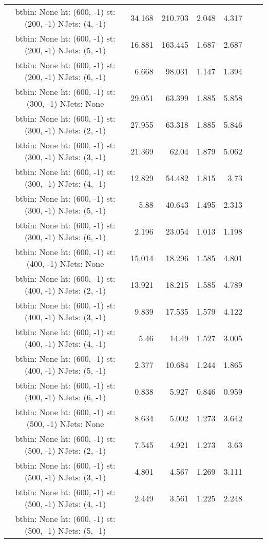 \documentclass[12pt]{paper}
\begin{document}
\begin{landscape}
\begin{longtable}{c|r|r|r|r|r|r}
btbin:  None ht:  (600, -1) st:  (200, -1) NJets:  (4, -1)
 & 34.168 & 210.703 & 2.048 & 4.317\\
btbin:  None ht:  (600, -1) st:  (200, -1) NJets:  (5, -1)
 & 16.881 & 163.445 & 1.687 & 2.687\\
btbin:  None ht:  (600, -1) st:  (200, -1) NJets:  (6, -1)
 & 6.668 & 98.031 & 1.147 & 1.394\\
btbin:  None ht:  (600, -1) st:  (300, -1) NJets:  None
 & 29.051 & 63.399 & 1.885 & 5.858\\
btbin:  None ht:  (600, -1) st:  (300, -1) NJets:  (2, -1)
 & 27.955 & 63.318 & 1.885 & 5.846\\
btbin:  None ht:  (600, -1) st:  (300, -1) NJets:  (3, -1)
 & 21.369 & 62.04 & 1.879 & 5.062\\
btbin:  None ht:  (600, -1) st:  (300, -1) NJets:  (4, -1)
 & 12.829 & 54.482 & 1.815 & 3.73\\
btbin:  None ht:  (600, -1) st:  (300, -1) NJets:  (5, -1)
 & 5.88 & 40.643 & 1.495 & 2.313\\
btbin:  None ht:  (600, -1) st:  (300, -1) NJets:  (6, -1)
 & 2.196 & 23.054 & 1.013 & 1.198\\
btbin:  None ht:  (600, -1) st:  (400, -1) NJets:  None
 & 15.014 & 18.296 & 1.585 & 4.801\\
btbin:  None ht:  (600, -1) st:  (400, -1) NJets:  (2, -1)
 & 13.921 & 18.215 & 1.585 & 4.789\\
btbin:  None ht:  (600, -1) st:  (400, -1) NJets:  (3, -1)
 & 9.839 & 17.535 & 1.579 & 4.122\\
btbin:  None ht:  (600, -1) st:  (400, -1) NJets:  (4, -1)
 & 5.46 & 14.49 & 1.527 & 3.005\\
btbin:  None ht:  (600, -1) st:  (400, -1) NJets:  (5, -1)
 & 2.377 & 10.684 & 1.244 & 1.865\\
btbin:  None ht:  (600, -1) st:  (400, -1) NJets:  (6, -1)
 & 0.838 & 5.927 & 0.846 & 0.959\\
btbin:  None ht:  (600, -1) st:  (500, -1) NJets:  None
 & 8.634 & 5.002 & 1.273 & 3.642\\
btbin:  None ht:  (600, -1) st:  (500, -1) NJets:  (2, -1)
 & 7.545 & 4.921 & 1.273 & 3.63\\
btbin:  None ht:  (600, -1) st:  (500, -1) NJets:  (3, -1)
 & 4.801 & 4.567 & 1.269 & 3.111\\
btbin:  None ht:  (600, -1) st:  (500, -1) NJets:  (4, -1)
 & 2.449 & 3.561 & 1.225 & 2.248\\
btbin:  None ht:  (600, -1) st:  (500, -1) NJets:  (5, -1)

\end{longtable}
\end{landscape}
\end{document}

